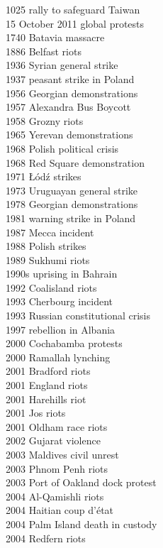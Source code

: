 1025 rally to safeguard Taiwan\\
15 October 2011 global protests\\
1740 Batavia massacre\\
1886 Belfast riots\\
1936 Syrian general strike\\
1937 peasant strike in Poland\\
1956 Georgian demonstrations\\
1957 Alexandra Bus Boycott\\
1958 Grozny riots\\
1965 Yerevan demonstrations\\
1968 Polish political crisis\\
1968 Red Square demonstration\\
1971 Łódź strikes\\
1973 Uruguayan general strike\\
1978 Georgian demonstrations\\
1981 warning strike in Poland\\
1987 Mecca incident\\
1988 Polish strikes\\
1989 Sukhumi riots\\
1990s uprising in Bahrain\\
1992 Coalisland riots\\
1993 Cherbourg incident\\
1993 Russian constitutional crisis\\
1997 rebellion in Albania\\
2000 Cochabamba protests\\
2000 Ramallah lynching\\
2001 Bradford riots\\
2001 England riots\\
2001 Harehills riot\\
2001 Jos riots\\
2001 Oldham race riots\\
2002 Gujarat violence\\
2003 Maldives civil unrest\\
2003 Phnom Penh riots\\
2003 Port of Oakland dock protest\\
2004 Al-Qamishli riots\\
2004 Haitian coup d'état\\
2004 Palm Island death in custody\\
2004 Redfern riots\\
